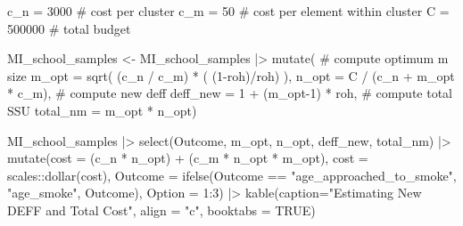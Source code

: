\documentclass[
  12pt]{article}
\newenvironment{Shaded}{\begin{snugshade}}{\end{snugshade}}
\newcommand{\AttributeTok}[1]{\textcolor[rgb]{0.40,0.45,0.13}{#1}}
\newcommand{\CommentTok}[1]{\textcolor[rgb]{0.37,0.37,0.37}{#1}}
\newcommand{\ConstantTok}[1]{\textcolor[rgb]{0.56,0.35,0.01}{#1}}
\newcommand{\DecValTok}[1]{\textcolor[rgb]{0.68,0.00,0.00}{#1}}
\newcommand{\FunctionTok}[1]{\textcolor[rgb]{0.28,0.35,0.67}{#1}}
\newcommand{\NormalTok}[1]{\textcolor[rgb]{0.00,0.23,0.31}{#1}}
\newcommand{\OtherTok}[1]{\textcolor[rgb]{0.00,0.23,0.31}{#1}}
\newcommand{\SpecialCharTok}[1]{\textcolor[rgb]{0.37,0.37,0.37}{#1}}
\newcommand{\StringTok}[1]{\textcolor[rgb]{0.13,0.47,0.30}{#1}}
\begin{document}
\begin{Shaded}
\begin{Highlighting}[]
\NormalTok{c\_n }\OtherTok{=} \DecValTok{3000} \CommentTok{\# cost per cluster}
\NormalTok{c\_m }\OtherTok{=} \DecValTok{50} \CommentTok{\# cost per element within cluster}
\NormalTok{C }\OtherTok{=} \DecValTok{500000} \CommentTok{\# total budget}

\NormalTok{MI\_school\_samples }\OtherTok{\textless{}{-}}\NormalTok{ MI\_school\_samples }\SpecialCharTok{|\textgreater{}} 
  \FunctionTok{mutate}\NormalTok{(}
    \CommentTok{\# compute optimum m size}
    \AttributeTok{m\_opt =} \FunctionTok{sqrt}\NormalTok{( (c\_n }\SpecialCharTok{/}\NormalTok{ c\_m) }\SpecialCharTok{*}\NormalTok{ ( (}\DecValTok{1}\SpecialCharTok{{-}}\NormalTok{roh)}\SpecialCharTok{/}\NormalTok{roh) ),}
    \AttributeTok{n\_opt =}\NormalTok{ C }\SpecialCharTok{/}\NormalTok{ (c\_n }\SpecialCharTok{+}\NormalTok{ m\_opt }\SpecialCharTok{*}\NormalTok{ c\_m),}
    \CommentTok{\# compute new deff}
    \AttributeTok{deff\_new =} \DecValTok{1} \SpecialCharTok{+}\NormalTok{ (m\_opt}\DecValTok{{-}1}\NormalTok{) }\SpecialCharTok{*}\NormalTok{ roh,}
     \CommentTok{\# compute total SSU}
    \AttributeTok{total\_nm =}\NormalTok{ m\_opt }\SpecialCharTok{*}\NormalTok{ n\_opt)}

\NormalTok{MI\_school\_samples }\SpecialCharTok{|\textgreater{}} 
  \FunctionTok{select}\NormalTok{(Outcome, m\_opt, n\_opt, deff\_new, total\_nm) }\SpecialCharTok{|\textgreater{}} 
  \FunctionTok{mutate}\NormalTok{(}\AttributeTok{cost =}\NormalTok{ (c\_n }\SpecialCharTok{*}\NormalTok{ n\_opt) }\SpecialCharTok{+}\NormalTok{ (c\_m }\SpecialCharTok{*}\NormalTok{ n\_opt }\SpecialCharTok{*}\NormalTok{ m\_opt),}
         \AttributeTok{cost =}\NormalTok{ scales}\SpecialCharTok{::}\FunctionTok{dollar}\NormalTok{(cost),}
         \AttributeTok{Outcome =} \FunctionTok{ifelse}\NormalTok{(Outcome }\SpecialCharTok{==} \StringTok{"age\_approached\_to\_smoke"}\NormalTok{, }
                          \StringTok{"age\_smoke"}\NormalTok{, Outcome),}
         \AttributeTok{Option =} \DecValTok{1}\SpecialCharTok{:}\DecValTok{3}\NormalTok{) }\SpecialCharTok{|\textgreater{}}
  \FunctionTok{kable}\NormalTok{(}\AttributeTok{caption=}\StringTok{"Estimating New DEFF and Total Cost"}\NormalTok{,}
        \AttributeTok{align =} \StringTok{"c"}\NormalTok{, }\AttributeTok{booktabs =} \ConstantTok{TRUE}\NormalTok{) }
\end{Highlighting}
\end{Shaded}
\end{document}
